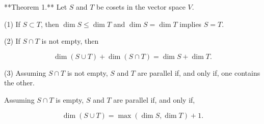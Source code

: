 **Theorem 1.** Let $S$ and $T$ be cosets in the vector space $V$.

(1) If $S \subset T$, then $\dim S \leq \dim T$ and $\dim S = \dim T$ implies $S = T$.

(2) If $S \cap T$ is not empty, then

$$\dim(S \cup T) + \dim(S \cap T) = \dim S + \dim T.$$

(3) Assuming $S \cap T$ is not empty, $S$ and $T$ are parallel if, and only if, one contains the other.

Assuming $S \cap T$ is empty, $S$ and $T$ are parallel if, and only if,

$$\dim(S \cup T) = \max(\dim S, \dim T) + 1.$$
